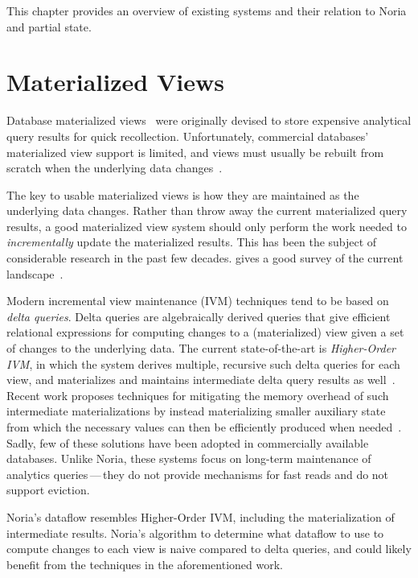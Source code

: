 This chapter provides an overview of existing systems and their relation to
Noria and partial state.

\section{Materialized Views}

Database materialized views~\cite{materialized-views} were originally devised to
store expensive analytical query results for quick recollection. Unfortunately,
commercial databases' materialized view support is limited, and views must
usually be rebuilt from scratch when the underlying data
changes~\cite{materialized-view-selection-sql-server,
mssql-materialized-view-restrictions-blog,
mssql-materialized-view-restrictions}.

The key to usable materialized views is how they are maintained as the
underlying data changes. Rather than throw away the current materialized query
results, a good materialized view system should only perform the work needed to
\textit{incrementally} update the materialized results. This has been the
subject of considerable research in the past few decades.
\citeauthor{materialized-survey} gives a good survey of the current
landscape~\cite{materialized-survey}.

Modern incremental view maintenance (IVM) techniques tend to be based on
\textit{delta queries}. Delta queries are algebraically derived queries that
give efficient relational expressions for computing changes to a (materialized)
view given a set of changes to the underlying data. The current state-of-the-art
is \textit{Higher-Order IVM}, in which the system derives multiple, recursive
such delta queries for each view, and materializes and maintains intermediate
delta query results as well~\cite{dbtoaster, hotdog}. Recent work proposes
techniques for mitigating the memory overhead of such intermediate
materializations by instead materializing smaller auxiliary state from which the
necessary values can then be efficiently produced when
needed~\cite{memory-efficient}. Sadly, few of these solutions have been adopted
in commercially available databases. Unlike Noria, these systems focus on
long-term maintenance of analytics queries\,---\,they do not provide mechanisms
for fast reads and do not support eviction.

Noria's dataflow resembles Higher-Order IVM, including the materialization of
intermediate results. Noria's algorithm to determine what dataflow to use to
compute changes to each view is naive compared to delta queries, and could
likely benefit from the techniques in the aforementioned work.

